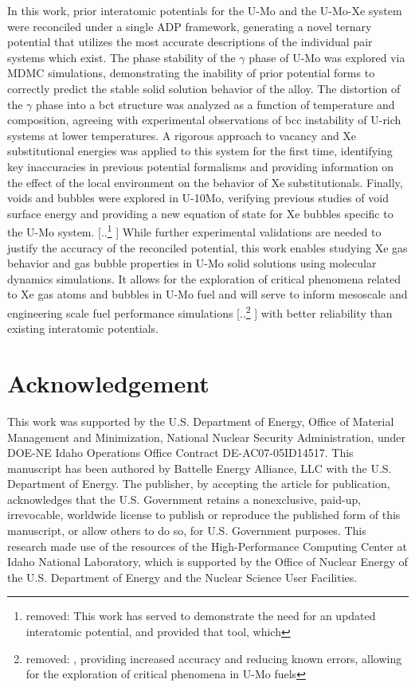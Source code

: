 \documentclass[review]{elsarticle}
\providecommand{\DIFaddtex}[1]{{\protect\color{blue} \sf #1}} %
\providecommand{\DIFdeltex}[1]{{\protect\color{red} [..\footnote{removed: #1} ]}} %
\providecommand{\DIFaddbegin}{} %
\providecommand{\DIFaddend}{} %
\providecommand{\DIFdelbegin}{} %
\providecommand{\DIFdelend}{} %
\providecommand{\DIFadd}[1]{\texorpdfstring{\DIFaddtex{#1}}{#1}} %
\providecommand{\DIFdel}[1]{\texorpdfstring{\DIFdeltex{#1}}{}} %
\newcommand{\DIFscaledelfig}{0.5}
\newlength{\DIFdelgraphicswidth} %
\newlength{\DIFdelgraphicsheight} %
\newcommand{\DIFaddincludegraphics}[2][]{{\color{blue}\fbox{\DIFOincludegraphics[#1]{#2}}}} %
\newcommand{\DIFdelincludegraphics}[2][]{%
\sbox{\DIFdelgraphicsbox}{\DIFOincludegraphics[#1]{#2}}%
\settoboxwidth{\DIFdelgraphicswidth}{\DIFdelgraphicsbox} %
\settoboxtotalheight{\DIFdelgraphicsheight}{\DIFdelgraphicsbox} %
\scalebox{\DIFscaledelfig}{%
\parbox[b]{\DIFdelgraphicswidth}{\usebox{\DIFdelgraphicsbox}\\[-\baselineskip] \rule{\DIFdelgraphicswidth}{0em}}\llap{\resizebox{\DIFdelgraphicswidth}{\DIFdelgraphicsheight}{%
\setlength{\unitlength}{\DIFdelgraphicswidth}%
\begin{picture}(1,1)%
\thicklines\linethickness{2pt} %
{\color[rgb]{1,0,0}\put(0,0){\framebox(1,1){}}}%
{\color[rgb]{1,0,0}\put(0,0){\line( 1,1){1}}}%
{\color[rgb]{1,0,0}\put(0,1){\line(1,-1){1}}}%
\end{picture}%
}\hspace*{3pt}}} %
} %
\DeclareRobustCommand{\DIFaddbegin}{\DIFOaddbegin \let\includegraphics\DIFaddincludegraphics} %
\DeclareRobustCommand{\DIFaddend}{\DIFOaddend \let\includegraphics\DIFOincludegraphics} %
\DeclareRobustCommand{\DIFdelbegin}{\DIFOdelbegin \let\includegraphics\DIFdelincludegraphics} %
\DeclareRobustCommand{\DIFdelend}{\DIFOaddend \let\includegraphics\DIFOincludegraphics} %
\begin{document}
In this work, prior interatomic potentials for the U-Mo and the U-Mo-Xe system were reconciled under a single ADP framework, generating a novel ternary potential that utilizes the most accurate descriptions of the individual pair systems which exist. The phase stability of the $\gamma$ phase of U-Mo was explored via MDMC simulations, demonstrating the inability of prior potential forms to correctly predict the stable solid solution behavior of the alloy. The distortion of the $\gamma$ phase into a bct structure was analyzed as a function of temperature and composition, agreeing with experimental observations of bcc instability of U-rich systems at lower temperatures. A rigorous approach to vacancy and Xe substitutional energies was applied to this system for the first time, identifying key inaccuracies in previous potential formalisms and providing information on the effect of the local environment on the behavior of Xe substitutionals. Finally, voids and bubbles were explored in U-10Mo, verifying previous studies of void surface energy and providing a new equation of state for Xe bubbles specific to the U-Mo system. \DIFdelbegin \DIFdel{This work has served to demonstrate the need for an updated interatomic potential, and provided that tool, which }\DIFdelend \DIFaddbegin \DIFadd{While further experimental validations are needed to justify the accuracy of the reconciled potential, this work enables studying Xe gas behavior and gas bubble properties in U-Mo solid solutions using molecular dynamics simulations. It allows for the exploration of critical phenomena related to Xe gas atoms and bubbles in U-Mo fuel and }\DIFaddend will serve to inform mesoscale and engineering scale fuel performance simulations \DIFdelbegin \DIFdel{, providing increased accuracy and reducing known errors, allowing for the exploration of critical phenomena in U-Mo fuels}\DIFdelend \DIFaddbegin \DIFadd{with better reliability than existing interatomic potentials}\DIFaddend .

\section{Acknowledgement}
This work was supported by the U.S. Department of Energy, Office of Material Management and Minimization, National Nuclear Security Administration, under DOE-NE Idaho Operations Office Contract DE-AC07-05ID14517. This manuscript has been authored by Battelle Energy Alliance, LLC with the U.S. Department of Energy. The publisher, by accepting the article for publication, acknowledges that the U.S. Government retains a nonexclusive, paid-up, irrevocable, worldwide license to publish or reproduce the published form of this manuscript, or allow others to do so, for U.S. Government purposes. This research made use of the resources of the High-Performance Computing Center at Idaho National Laboratory, which is supported by the Office of Nuclear Energy of the U.S. Department of Energy and the Nuclear Science User Facilities.



\end{document}
